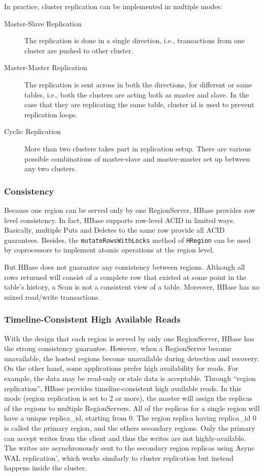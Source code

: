 \documentclass[11pt]{book}
\begin{document}
In practice, cluster replication can be implemented in multiple modes:
\begin{description}
\item[Master-Slave Replication]
The replication is done in a single direction, i.e., transactions from one cluster are pushed to other cluster.
\item[Master-Master Replication]
The replication is sent across in both the directions, for different or same tables, i.e., both the clusters are acting both as master and slave. In the case that they are replicating the same table, cluster id is used to prevent replication loops.
\item[Cyclic Replication]
More than two clusters takes part in replication setup. There are various possible combinations of master-slave and master-master set up between any two clusters. 
\end{description}

\subsubsection{Consistency}
Because one region can be served only by one RegionServer, HBase provides row level consistency. In fact, HBase supports row-level ACID in limited ways. Basically, multiple Puts and Deletes to the same row provide all ACID guarantees. Besides, the \texttt{mutateRowsWithLocks} method of \texttt{HRegion} can be used by coprocessors to implement atomic operations at the region level.

But HBase does not guarantee any consistency between regions. Although all rows returned will consist of a complete row that existed at some point in the table's history, a Scan is not a consistent view of a table. Moreover,  HBase has no mixed read/write transactions.

\subsubsection{Timeline-Consistent High Available Reads}
With the design that each region is served by only one RegionServer, HBase has the strong consistency guarantee. However, when a RegionServer become unavailable, the hosted regions become unavailable during detection and recovery. On the other hand, some applications prefer high availability for reads. For example, the data may be read-only or stale data is acceptable. Through ``region replication'', HBase provides timeline-consistent high available reads. In this mode (region replication is set to 2 or more), the master will assign the replicas of the regions to multiple RegionServers.  All of the replicas for a single region will have a unique replica\_id, starting from 0. The region replica having replica\_id 0 is called the primary region, and the others secondary regions. Only the primary can accept writes from the client and thus the writes are not highly-available. The writes are asynchronously sent to the secondary region replicas using Async WAL replication', which works similarly to cluster replication but instead happens inside the cluster.
\end{document}
